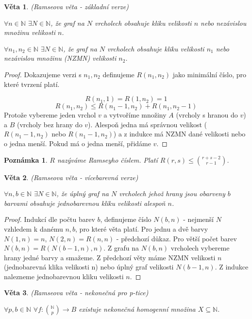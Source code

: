 \documentclass[a4paper,10pt,titlepage]{article} \usepackage[utf8]{inputenc}
\newtheorem{theorem}{Věta}
\newtheorem*{remark}{Poznámka}
\begin{document}
\begin{theorem}
(Ramseova věta - základní verze)

$\forall n \in \mathbb{N}$ $\exists N \in \mathbb{N}$, že graf na $N$ vrcholech obsahuje kliku velikosti $n$ nebo
nezávislou množinu velikosti $n$.

$\forall n_1, n_2 \in \mathbb{N}$ $\exists N \in \mathbb{N}$, že graf na $N$ vrcholech obsahuje kliku velikosti $n_1$ nebo
nezávislou množinu (NZMN) velikosti $n_2$.
\end{theorem}

\begin{proof}
Dokazujeme verzi s $n_1,n_2$ definujeme $R(n_1,n_2)$ jako minimální číslo, pro které tvrzení platí.

\[
	R(n_1,1) = R(1,n_2) = 1
\]
\[
	R(n_1,n_2) \leq R(n_1-1,n_2) + R(n_1,n_2-1)
\]
Protože vybereme jeden vrchol $v$ a vytvoříme množiny $A$ (vrcholy s hranou do $v$) a $B$ (vrcholy bez hrany do $v$).
Alespoň jedna má správnou velikost ($R(n_1-1,n_2)$ nebo $R(n_1-1,n_2)$) a z indukce má NZMN dané velikosti nebo o jedna menší.
Pokud má o jedna menší, přidáme $v$.
\end{proof}

\begin{remark}
$R$ nazýváme Ramseyho číslem. Platí $R(r, s) \leq \binom{r+s-2}{r-1}$.
\end{remark}

\begin{theorem}
(Ramseova věta - vícebarevná verze)

$\forall n,b \in \mathbb{N}$ $\exists N \in \mathbb{N}$, že úplný graf na $N$ vrcholech jehož hrany jsou obarveny $b$ barvami
obsahuje jednobarevnou kliku velikosti alespoň $n$.
\end{theorem}

\begin{proof}
Indukcí dle počtu barev $b$, definujeme číslo $N(b,n)$ - nejmenší $N$ vzhledem k danému $n,b$, pro které věta platí.
Pro jednu a dvě barvy $N(1,n)=n$, $N(2,n)=R(n,n)$ - předchozí důkaz.
Pro větší počet barev $N(b,n) = R(N(b-1,n),n)$.
Z grafu na $N(b,n)$ vrcholech vybereme hrany jedné barvy a smažeme.
Z předchozí věty máme NZMN velikosti $n$ (jednobarevná klika velikosti n) nebo úplný graf velikosti $N(b-1,n)$.
Z indukce nalezneme jednobarevnou kliku velikosti $n$.
\end{proof}

\begin{theorem}
(Ramseova věta - nekonečná pro p-tice)

$\forall p,b \in \mathbb{N}$ $\forall f:\binom{\mathbb N}{p} \rightarrow B$ existuje nekonečná homogenní množina $X \subseteq \mathbb{N}$.
\end{theorem}
\end{document}
